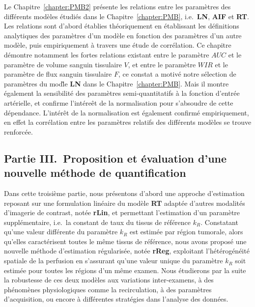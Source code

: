 \begin{otherlanguage}{francais}
Le Chapitre~\ref{chapter:PMB2} pr\'esente les relations entre les param\`etres des diff\'erents mod\`eles \'etudi\'es dans le Chapitre~\ref{chapter:PMB}, i.e.~\textbf{LN}, \textbf{AIF} et \textbf{RT}.
Les relations sont d'abord \'etablies th\'eoriquement en \'etablissant les d\'efinitions analytiques des param\`etres d'un mod\`ele en fonction des param\`etres d'un autre mod\`ele, puis empiriquement \`a travers une \'etude de corr\'elation.
Ce chapitre d\'emontre notamment les fortes relations existant entre le param\`etre $AUC$ et le param\`etre de volume sanguin tissulaire $V$, et entre le param\`etre $WIR$ et le param\`etre de flux sanguin tissulaire $F$, ce constat a motiv\'e notre s\'election de param\`etres du mod\`le \textbf{LN} dans le Chapitre~\ref{chapter:PMB}. 
Mais il montre \'egalement la sensibilit\'e des param\`etres semi-quantitatifs \`a la fonction d'entr\'ee art\'erielle, et confirme l'int\'ere\^et de la normalisation pour s'absoudre de cette d\'ependance.
L'int\'er\^et de la normalisation est \'egalement confirm\'e empiriquement, en effet la corr\'elation entre les param\`etres relatifs des diff\'erents mod\`eles se trouve renforc\'ee.

\subsection*{Partie III.~Proposition et \'evaluation d'une nouvelle m\'ethode de quantification}
Dans cette troisi\`eme partie, nous pr\'esentons d'abord une approche d'estimation reposant sur une formulation lin\'eaire du mod\`ele \textbf{RT} adapt\'ee d'autres modalit\'es d'imagerie de contrast, not\'ee \textbf{rLin}, et permettant l'estimation d'un param\`etre suppl\'ementaire, i.e.~la constant de taux du tissus de r\'ef\'erence $k_R$.
Constatant qu'une valeur diff\'erente du param\`etre $k_R$ est estim\'ee par r\'egion tumorale, alors qu'elles caract\'erisent toutes le m\^eme tissus de r\'ef\'erence, nous avons propos\'e une nouvelle m\'ethode d'estimation r\'egularis\'ee, not\'ee \textbf{rReg}, exploitant l'h\'et\'erog\'en\'eit\'e spatiale de la perfusion en s'assurant qu'une valeur unique du param\`etre $k_R$ soit estim\'ee pour toutes les r\'egions d'un m\^eme examen.
Nous \'etudierons par la suite la robustesse de ces deux mod\`eles aux variations inter-examens, \`a des ph\'enom\`enes physiologiques comme la recirculation, \`a des param\`etres d'acquisition, ou encore \`a diff\'erentes strat\'egies dans l'analyse des donn\'ees.


\end{otherlanguage}
